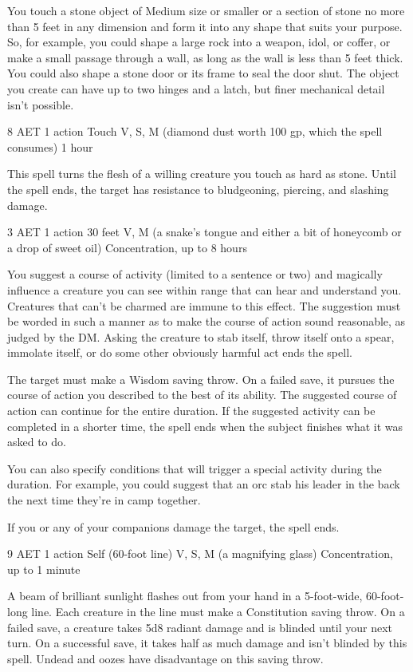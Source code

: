 You touch a stone object of Medium size or smaller or a section of stone no more than 5 feet in any dimension and form it into any shape that suits your purpose. So, for example, you could shape a large rock into a weapon, idol, or coffer, or make a small passage through a wall, as long as the wall is less than 5 feet thick. You could also shape a stone door or its frame to seal the door shut. The object you create can have up to two hinges and a latch, but finer mechanical detail isn't possible.

{8 AET}
{1 action}
{Touch}
{V, S, M (diamond dust worth 100 gp, which the spell consumes)}
{1 hour}

This spell turns the flesh of a willing creature you touch as hard as stone. Until the spell ends, the target has resistance to bludgeoning, piercing, and slashing damage.

{3 AET}
{1 action}
{30 feet}
{V, M (a snake's tongue and either a bit of honeycomb or a drop of sweet oil)}
{Concentration, up to 8 hours}

You suggest a course of activity (limited to a sentence or two) and magically influence a creature you can see within range that can hear and understand you. Creatures that can't be charmed are immune to this effect. The suggestion must be worded in such a manner as to make the course of action sound reasonable, as judged by the DM. Asking the creature to stab itself, throw itself onto a spear, immolate itself, or do some other obviously harmful act ends the spell.

The target must make a Wisdom saving throw. On a failed save, it pursues the course of action you described to the best of its ability. The suggested course of action can continue for the entire duration. If the suggested activity can be completed in a shorter time, the spell ends when the subject finishes what it was asked to do.

You can also specify conditions that will trigger a special activity during the duration. For example, you could suggest that an orc stab his leader in the back the next time they're in camp together.

If you or any of your companions damage the target, the spell ends.

{9 AET}
{1 action}
{Self (60-foot line)}
{V, S, M (a magnifying glass)}
{Concentration, up to 1 minute}

A beam of brilliant sunlight flashes out from your hand in a 5-foot-wide, 60-foot-long line. Each creature in the line must make a Constitution saving throw. On a failed save, a creature takes 5d8 radiant damage and is blinded until your next turn. On a successful save, it takes half as much damage and isn't blinded by this spell. Undead and oozes have disadvantage on this saving throw.

